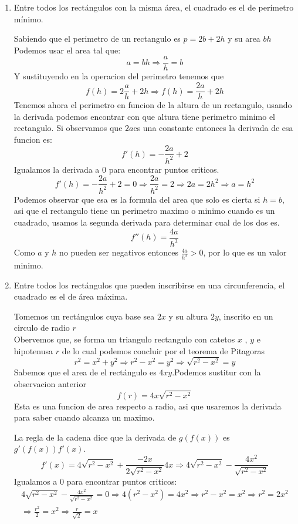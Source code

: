 \documentclass[12pt]{article}
\begin{document}
\begin{enumerate}[\hspace{9px} a)]
    \item Entre todos los rect\'angulos con la misma \'area, el cuadrado es el de per\'imetro m\'inimo.\medskip
    
    Sabiendo que el perimetro de un rectangulo es \(p=2b+2h\) y su area \(bh\)
    Podemos usar el area tal que: \[a=bh\Rightarrow \displaystyle\frac{a}{h}=b\]
    Y sustituyendo en la operacion del perimetro tenemos que \[f(h)=2\displaystyle\frac{a}{h}+2h\Rightarrow f(h)=\displaystyle\frac{2a}{h}+2h\]
    Tenemos ahora el perimetro en funcion de la altura de un rectangulo, usando la derivada podemos encontrar con que altura tiene perimetro minimo el rectangulo. Si observamos que \(2a\)es una constante entonces la derivada de esa funcion es: 
    \[f'(h)=-\displaystyle\frac{2a}{h^2}+2\]
    Igualamos la derivada a 0 para encontrar puntos criticos.
    \[f'(h)=-\displaystyle\frac{2a}{h^2}+2=0\Rightarrow \displaystyle\frac{2a}{h^2}=2\Rightarrow 2a=2h^2\Rightarrow a=h^2\]
    Podemos observar que esa es la formula del area que solo es cierta si \(h=b\), asi que el rectangulo tiene un perimetro maximo o minimo cuando es un cuadrado, usamos la segunda derivada para determinar cual de los dos es.
    \[f''(h)=\displaystyle\frac{4a}{h^3}\]
    Como \(a\) y \(h\) no pueden ser negativos entonces \(\displaystyle\frac{4a}{h^3}>0\), por lo que es un valor minimo.\medskip

    \item Entre todos los rect\'angulos que pueden inscribirse en una circunferencia, el cuadrado es el de \'area m\'axima.\medskip
    
    Tomemos un rect\'angulos cuya base sea \(2x\) y su altura \(2y\), inscrito en un circulo de radio \(r\)\\
    Obervemos que, se forma un triangulo rectangulo con catetos \(x\) , \(y\) e hipotenusa \(r\) de lo cual podemos concluir por el teorema de Pitagoras 
    \[r^2=x^2+y^2\Rightarrow r^2-x^2=y^2\Rightarrow \sqrt{r^2-x^2}=y\]
    Sabemos que el area de el rect\'angulo es \(4xy\).\quad Podemos sustitur con la observacion anterior
    \[f(r)=4x\sqrt{r^2-x^2}\]
    Esta es una funcion de area respecto a radio, asi que usaremos la derivada para saber cuando alcanza un maximo.\medskip
    
    La regla de la cadena dice que la derivada de \(g(f(x))\) es \(g'(f(x))f'(x)\).
    \[f'(x)=4\sqrt{r^2-x^2}+\displaystyle\frac{-2x}{2\sqrt{r^2-x^2}}4x\Rightarrow 4\sqrt{r^2-x^2}-\displaystyle\frac{4x^2}{\sqrt{r^2-x^2}}\]
    Igualamos a 0 para encontrar puntos criticos:
    \begin{multline*}
        4\sqrt{r^2-x^2}-\displaystyle\frac{4x^2}{\sqrt{r^2-x^2}}=0\Rightarrow 4(r^2-x^2)=4x^2\Rightarrow r^2-x^2=x^2\Rightarrow r^2=2x^2\\
        \Rightarrow \displaystyle\frac{r^2}{2}=x^2\Rightarrow \displaystyle\frac{r}{\sqrt{2}}=x
    \end{multline*}


\end{enumerate}
\end{document}
